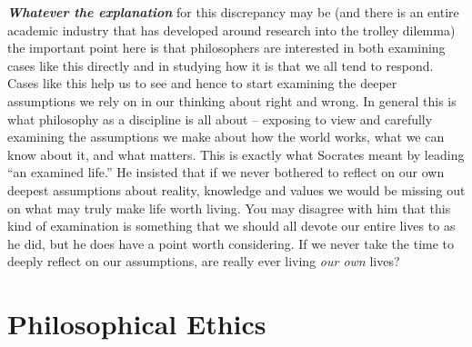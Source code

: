 \documentclass[
  12pt, openany]{book}
\theoremstyle{definition}
\theoremstyle{definition}
\theoremstyle{definition}
\theoremstyle{definition}
\theoremstyle{remark}
\begin{document}
\textbf{\emph{Whatever the explanation}} for this discrepancy may be (and there is an entire academic industry that has developed around research into the trolley dilemma) the important point here is that philosophers are interested in both examining cases like this directly and in studying how it is that we all tend to respond. Cases like this help us to see and hence to start examining the deeper assumptions we rely on in our thinking about right and wrong. In general this is what philosophy as a discipline is all about -- exposing to view and carefully examining the assumptions we make about how the world works, what we can know about it, and what matters. This is exactly what Socrates meant by leading ``an examined life.'' He insisted that if we never bothered to reflect on our own deepest assumptions about reality, knowledge and values we would be missing out on what may truly make life worth living. You may disagree with him that this kind of examination is something that we should all devote our entire lives to as he did, but he does have a point worth considering. If we never take the time to deeply reflect on our assumptions, are really ever living \emph{our own} lives?

\hypertarget{philosophical-ethics}{%
\section{Philosophical Ethics}\label{philosophical-ethics}}
\end{document}
